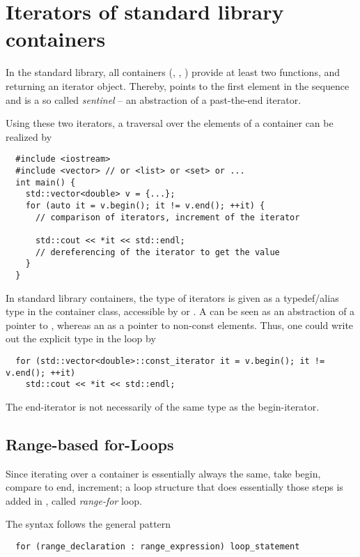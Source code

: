 \section{Iterators of standard library containers}
In the standard library, all containers (\eg {}, , ) provide at least two functions,  and 
returning an iterator object. Thereby,  points to the first element in the sequence and  is a so called \emph{sentinel} -- an abstraction of a past-the-end iterator.

Using these two iterators, a traversal over the elements of a container can be realized by
%
\begin{verbatim}
  #include <iostream>
  #include <vector> // or <list> or <set> or ...
  int main() {
    std::vector<double> v = {...};
    for (auto it = v.begin(); it != v.end(); ++it) {
      // comparison of iterators, increment of the iterator

      std::cout << *it << std::endl;
      // dereferencing of the iterator to get the value
    }
  }
\end{verbatim}

In standard library containers, the type of iterators is given as a typedef/alias type in the container class, accessible by  or
. A  can be seen as an abstraction of a pointer to , whereas an  as a pointer to
non-const elements. Thus, one could write out the explicit type in the loop by
%
\begin{verbatim}
  for (std::vector<double>::const_iterator it = v.begin(); it != v.end(); ++it)
    std::cout << *it << std::endl;
\end{verbatim}

The\marginpar{[\cxx{17}]} end-iterator is not necessarily of the same type as the begin-iterator.

\subsection{Range-based for-Loops}
Since iterating over a container is essentially always the same, take begin, compare to end, increment; a loop structure that does essentially
those steps is added in , called \emph{range-for} loop.

The syntax follows the general pattern
\begin{verbatim}
  for (range_declaration : range_expression) loop_statement
\end{verbatim}

